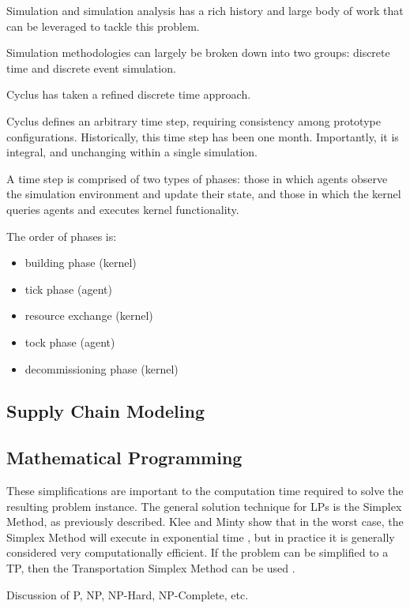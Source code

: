 Simulation and simulation analysis has a rich history and large body of work
that can be leveraged to tackle this problem.

Simulation methodologies can largely be broken down into two groups: discrete
time and discrete event simulation. 

Cyclus has taken a refined discrete time approach.

Cyclus defines an arbitrary time step, requiring consistency among prototype
configurations. Historically, this time step has been one month. Importantly, it
is integral, and unchanging within a single simulation.

A time step is comprised of two types of phases: those in which agents observe
the simulation environment and update their state, and those in which the kernel
queries agents and executes kernel functionality.

The order of phases is:

\begin{itemize}
  \item building phase (kernel)
  \item tick phase (agent)
  \item resource exchange (kernel)
  \item tock phase (agent)
  \item decommissioning phase (kernel)
\end{itemize}

\subsection{Supply Chain Modeling}

\subsection{Mathematical Programming}\label{intro:prog}

These simplifications are important to the computation time required to solve
the resulting problem instance. The general solution technique for LPs is the
Simplex Method, as previously described. Klee and Minty show that in the worst
case, the Simplex Method will execute in exponential time \cite{klee_good_1970},
but in practice it is generally considered very computationally efficient. If
the problem can be simplified to a TP, then the Transportation Simplex Method
can be used \cite{ahuja_network_1993}.

Discussion of P, NP, NP-Hard, NP-Complete, etc.

